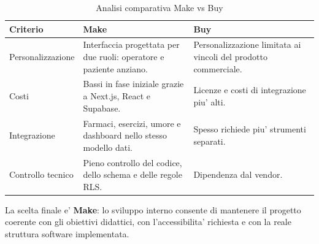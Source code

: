 \begin{table}[H]
\centering
\renewcommand{\arraystretch}{1.35}
\begin{tabularx}{\textwidth}{|p{3cm}|X|X|}
\hline
\textbf{Criterio} & \textbf{Make} & \textbf{Buy} \\
\hline
Personalizzazione & Interfaccia progettata per due ruoli: operatore e paziente anziano. & Personalizzazione limitata ai vincoli del prodotto commerciale. \\
\hline
Costi & Bassi in fase iniziale grazie a Next.js, React e Supabase. & Licenze e costi di integrazione piu' alti. \\
\hline
Integrazione & Farmaci, esercizi, umore e dashboard nello stesso modello dati. & Spesso richiede piu' strumenti separati. \\
\hline
Controllo tecnico & Pieno controllo del codice, dello schema e delle regole RLS. & Dipendenza dal vendor. \\
\hline
\end{tabularx}
\caption{Analisi comparativa Make vs Buy}
\label{tab:make-or-buy}
\end{table}

La scelta finale e' \textbf{Make}: lo sviluppo interno consente di mantenere il progetto coerente con gli obiettivi didattici, con l'accessibilita' richiesta e con la reale struttura software implementata.

\newpage
